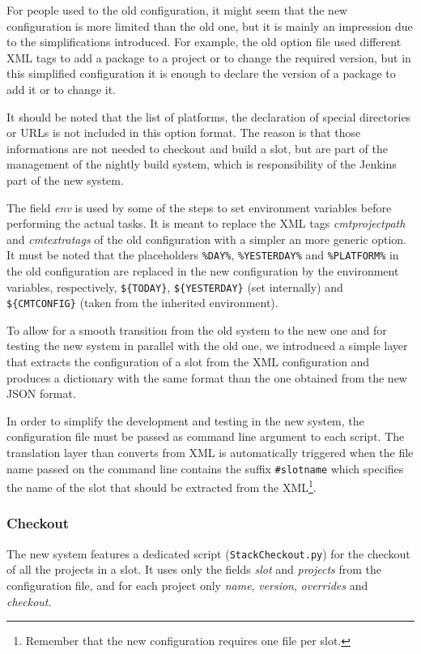 \documentclass{lhcbnote}
\begin{document}
For people used to the old configuration, it might seem that the new
configuration is more limited than the old one, but it is mainly an impression
due to the simplifications introduced.  For example, the old option file used
different XML tags to add a package to a project or to change the required
version, but in this simplified configuration it is enough to declare the
version of a package to add it or to change it.

It should be noted that the list of platforms, the declaration of special
directories or URLs is not included in this option format.  The reason is that
those informations are not needed to checkout and build a slot, but are part of
the management of the nightly build system, which is responsibility of the
Jenkins part of the new system.

The field \emph{env} is used by some of the steps to set environment variables
before performing the actual tasks.  It is meant to replace the XML tags
\emph{cmtprojectpath} and \emph{cmtextratags} of the old configuration with a
simpler an more generic option.  It must be noted that the placeholders
\texttt{\%DAY\%}, \texttt{\%YESTERDAY\%} and \texttt{\%PLATFORM\%} in the old
configuration are replaced in the new configuration by the environment
variables, respectively, \verb|${TODAY}|, \verb|${YESTERDAY}| (set internally)
and \verb|${CMTCONFIG}| (taken from the inherited environment).

To allow for a smooth transition from the old system to the new one and for
testing the new system in parallel with the old one, we introduced a simple
layer that extracts the configuration of a slot from the XML configuration and
produces a dictionary with the same format than the one obtained from the new
JSON format.

In order to simplify the development and testing in the new system, the
configuration file must be passed as command line argument to each script.  The
translation layer than converts from XML is automatically triggered when the
file name passed on the command line contains the suffix \texttt{\#slotname}
which specifies the name of the slot that should be extracted from the
XML\footnote{%
  Remember that the new configuration requires one file per slot.}.

\subsubsection{Checkout}
\label{CoreTools:CheckOut}
The new system features a dedicated script (\texttt{StackCheckout.py}) for the
checkout of all the projects in a slot.  It uses only the fields \emph{slot} and
\emph{projects} from the configuration file, and for each project only
\emph{name}, \emph{version}, \emph{overrides} and \emph{checkout}.
\end{document}
